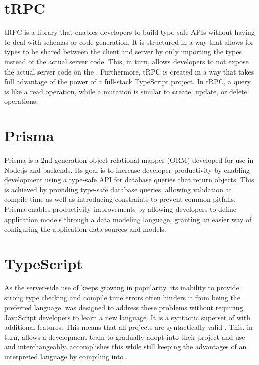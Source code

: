\section{tRPC}
tRPC is a library that enables developers to build type safe APIs without having to deal with schemas or code generation.
It is structured in a way that allows for types to be shared between the client and server by only importing the types instead of the actual server code.
This, in turn, allows developers to not expose the actual server code on the \frontend{}.
Furthermore, tRPC is created in a way that takes full advantage of the power of a full-stack TypeScript project\cite{tRPC}.
In tRPC, a query is like a read operation, while a mutation is similar to create, update, or delete operations.

\section{Prisma}
Prisma is a 2nd generation object-relational mapper (ORM) developed for use in Node.js and \typescript{} backends.
Its goal is to increase developer productivity by enabling development using a type-safe API for database queries that return \javascript{} objects.
This is achieved by providing type-safe database queries, allowing validation at compile time as well as introducing constraints to prevent common pitfalls\cite{Prisma_Why}.
Prisma enables productivity improvements by allowing developers to define application models through a data modeling language, granting an easier way of configuring the application data sources and models\cite{Prisma_Doc}.

\section{TypeScript}
As the server-side use of \javascript{} keeps growing in popularity, its inability to provide strong type checking and compile time errors often hinders it from being the preferred language.
\typescript{} was designed to address these problems without requiring JavaScript developers to learn a new language.
It is a syntactic superset of \javascript{} with additional features.
This means that all \javascript{} projects are syntactically valid \typescript{}. This, in turn, allows a development team to gradually adopt \typescript{} into their project and use \typescript{} and \javascript{} interchangeably\cite{TypeScript}.
\typescript{} accomplishes this while still keeping the advantages of an interpreted language by compiling into \javascript{}.

